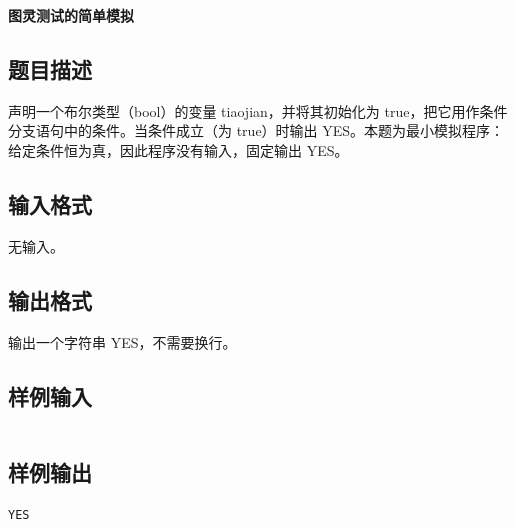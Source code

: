 \documentclass{article}
\newcommand{\problemname}[1]{\begin{center}\Large\bfseries #1\end{center}}
\begin{document}
\problemname{图灵测试的简单模拟}

\subsection*{题目描述}
声明一个布尔类型（bool）的变量 tiaojian，并将其初始化为 true，把它用作条件分支语句中的条件。当条件成立（为 true）时输出 YES。本题为最小模拟程序：给定条件恒为真，因此程序没有输入，固定输出 YES。

\subsection*{输入格式}
无输入。

\subsection*{输出格式}
输出一个字符串 YES，不需要换行。

\subsection*{样例输入}
\begin{verbatim}

\end{verbatim}

\subsection*{样例输出}
\begin{verbatim}
YES
\end{verbatim}
\end{document}
